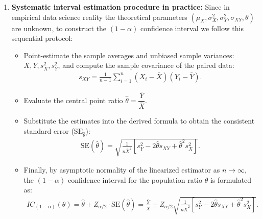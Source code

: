 \begin{solucion}
\begin{enumerate}
		\begin{align}
			\Var(\bar{X}) = \frac{\sigma_X^2}{n}, \quad \Var(\bar{Y}) = \frac{\sigma_Y^2}{n}, \quad \cov(\bar{X}, \bar{Y}) = \frac{\sigma_{XY}}{n}.
		\end{align}
		Substituting these sampling variances into the equation and factoring out $1 / (n \mu_X^2)$:
		\begin{align}
			\Var(\hat{\theta}) \approx \frac{\theta^2}{\mu_X^2} \left( \frac{\sigma_X^2}{n} \right) + \frac{1}{\mu_X^2} \left( \frac{\sigma_Y^2}{n} \right) - \frac{2\theta}{\mu_X^2} \left( \frac{\sigma_{XY}}{n} \right) = \frac{1}{n \mu_X^2} \left[ \sigma_Y^2 - 2\theta \sigma_{XY} + \theta^2 \sigma_X^2 \right].
		\end{align}
		This formally proves the fundamental result of the Delta Method for algebraic ratios of averages.
		
		\item \textbf{Systematic interval estimation procedure in practice:}
		Since in empirical data science reality the theoretical parameters $(\mu_X, \sigma_X^2, \sigma_Y^2, \sigma_{XY}, \theta)$ are unknown, to construct the $(1-\alpha)$ confidence interval we follow this sequential protocol:
		\begin{itemize}
			\item Point-estimate the sample averages and unbiased sample variances: $\bar{X}, \bar{Y}, s_X^2, s_Y^2$, and compute the sample covariance of the paired data:
			\begin{align}
				s_{XY} = \frac{1}{n-1} \sum_{i=1}^n (X_i - \bar{X})(Y_i - \bar{Y}).
			\end{align}
			\item Evaluate the central point ratio $\hat{\theta} = \dfrac{\bar{Y}}{\bar{X}}$.
			\item Substitute the estimates into the derived formula to obtain the consistent standard error ($\text{SE}_{\hat{\theta}}$):
			\begin{align}
				\text{SE}(\hat{\theta}) = \sqrt{ \frac{1}{n \bar{X}^2} \left[ s_Y^2 - 2\hat{\theta} s_{XY} + \hat{\theta}^2 s_X^2 \right] }.
			\end{align}
			\item Finally, by asymptotic normality of the linearized estimator as $n \to \infty$, the $(1-\alpha)$ confidence interval for the population ratio $\theta$ is formulated as:
			\begin{align}
				IC_{(1-\alpha)}(\theta) = \hat{\theta} \pm Z_{\alpha/2} \cdot \text{SE}(\hat{\theta}) = \frac{\bar{Y}}{\bar{X}} \pm Z_{\alpha/2} \sqrt{ \frac{1}{n \bar{X}^2} \left[ s_Y^2 - 2\hat{\theta} s_{XY} + \hat{\theta}^2 s_X^2 \right] }.
			\end{align}
		\end{itemize}
	\end{enumerate}
\end{solucion}
